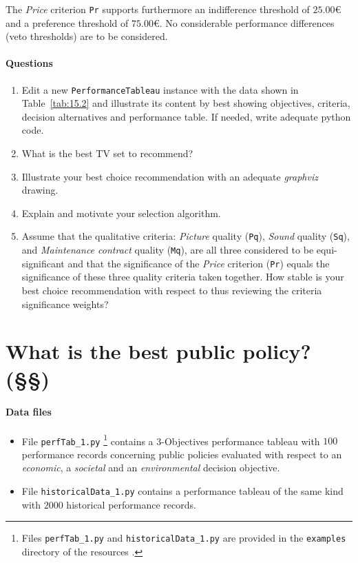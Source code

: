The \emph{Price} criterion \texttt{Pr} supports furthermore an indifference threshold of $25.00$€ and a preference threshold of $75.00$€. No considerable performance differences (veto thresholds) are to be considered.

\paragraph{\textbf{Questions}}

\begin{enumerate}
\item Edit a new \texttt{PerformanceTableau} instance with the data shown in Table~\vref{tab:15.2} and illustrate its content by best showing objectives, criteria, decision alternatives and performance table. If needed, write adequate python code.
\item What is the best TV set to recommend?
\item Illustrate your best choice recommendation with an adequate \emph{graphviz} drawing.
\item Explain and motivate your selection algorithm.
\item Assume that the qualitative criteria: \emph{Picture} quality (\texttt{Pq}), \emph{Sound} quality (\texttt{Sq}), and \emph{Maintenance contract} quality (\texttt{Mq}), are all three considered to be equi-significant and that the significance of the \emph{Price} criterion (\texttt{Pr}) equals the significance of these three quality criteria taken together. How stable is your best choice recommendation with respect to thus reviewing the criteria significance weights?
\end{enumerate}   

\section{What is the best public policy? (§§)}
\label{sec:15.4}

\paragraph{\textbf{Data files}}

\begin{itemize}
\item File \texttt{perfTab\_1.py} \footnote{Files \texttt{perfTab\_1.py} and \texttt{historicalData\_1.py} are provided in the \texttt{examples} directory of the \Digraph resources \citep{BIS-2021b}.} contains a 3-Objectives performance tableau with $100$ performance records concerning public policies evaluated with respect to an \emph{economic}, a \emph{societal} and an \emph{environmental} decision objective.
\item File \texttt{historicalData\_1.py} contains a performance tableau of the same kind with $2000$ historical performance records.
\end{itemize}


